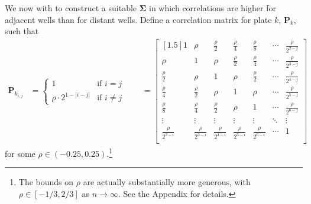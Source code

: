 \documentclass[11pt, letterpaper]{article}
\numberwithin{equation}{section}
\begin{document}
We now with to construct a suitable $\bm  \Sigma$ in which correlations are higher for adjacent wells than for distant wells. Define a correlation matrix for plate $k$, $\bm P_k$, such that 
\begin{align*}
\bm P_{k_{i,j}} & = \begin{cases}
1 & \text{if } i = j \\
\rho \cdot 2 ^{1-|i-j|} & \text{if } i \neq j 
\end{cases} \qquad
= \begin{bmatrix}[1.5]
1 & \rho& \frac{\rho}{2} & \frac{\rho}{4} & \frac{\rho}{8} & \cdots & \frac{\rho}{2^{2-j}} \\
\rho & 1 & \rho & \frac{\rho}{2} & \frac{\rho}{4} & \cdots & \frac{\rho}{2^{3-j}} \\
\frac{\rho}{2} & \rho & 1 & \rho& \frac{\rho}{2} &  \cdots & \frac{\rho}{2^{4-j}} \\
\frac{\rho}{4} & \frac{\rho}{2} & \rho & 1   & \rho &  \cdots & \frac{\rho}{2^{5-j}} \\
\frac{\rho}{8} & \frac{\rho}{4} & \frac{\rho}{2} & \rho & 1  &  \cdots & \frac{\rho}{2^{6-j}} \\
\vdots & \vdots & \vdots & \vdots & \vdots &\ddots & \vdots \\
\frac{\rho}{2^{2-i}} & \frac{\rho}{2^{3-i}} & \frac{\rho}{2^{4-i}} & \frac{\rho}{2^{5-i}} & \frac{\rho}{2^{6-i}} & \cdots & 1 \\
\end{bmatrix}
\end{align*}
for some $\rho \in (-0.25,0.25)$.\footnote{The bounds on $\rho$ are actually substantially more generous, with $\rho \in [-1/3,2/3]$ as $n \to \infty$. See the Appendix for details.}
\end{document}
